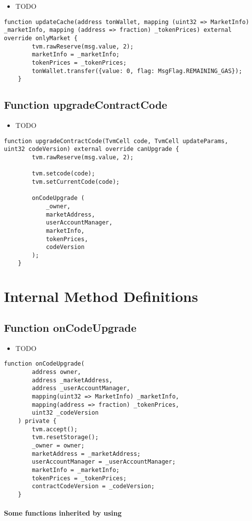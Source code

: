 \noindent\begin{itemize}
\item TODO
\end{itemize}

\begin{lstlisting}[firstnumber=84]
    function updateCache(address tonWallet, mapping (uint32 => MarketInfo) _marketInfo, mapping (address => fraction) _tokenPrices) external override onlyMarket {
        tvm.rawReserve(msg.value, 2);
        marketInfo = _marketInfo;
        tokenPrices = _tokenPrices;
        tonWallet.transfer({value: 0, flag: MsgFlag.REMAINING_GAS});
    }
\end{lstlisting}

\subsection{Function upgradeContractCode}

\noindent\begin{itemize}
\item TODO
\end{itemize}

\begin{lstlisting}[firstnumber=26]
    function upgradeContractCode(TvmCell code, TvmCell updateParams, uint32 codeVersion) external override canUpgrade {
        tvm.rawReserve(msg.value, 2);

        tvm.setcode(code);
        tvm.setCurrentCode(code);

        onCodeUpgrade (
            _owner,
            marketAddress,
            userAccountManager,
            marketInfo,
            tokenPrices,
            codeVersion
        );
    }
\end{lstlisting}

\section{Internal Method Definitions}


\subsection{Function onCodeUpgrade}

\noindent\begin{itemize}
\item TODO
\end{itemize}

\begin{lstlisting}[firstnumber=42]
    function onCodeUpgrade(
        address owner,
        address _marketAddress,
        address _userAccountManager,
        mapping(uint32 => MarketInfo) _marketInfo,
        mapping(address => fraction) _tokenPrices,
        uint32 _codeVersion
    ) private {
        tvm.accept();
        tvm.resetStorage();
        _owner = owner;
        marketAddress = _marketAddress;
        userAccountManager = _userAccountManager;
        marketInfo = _marketInfo;
        tokenPrices = _tokenPrices;
        contractCodeVersion = _codeVersion;
    }
\end{lstlisting}
\paragraph{Some functions inherited by using}
